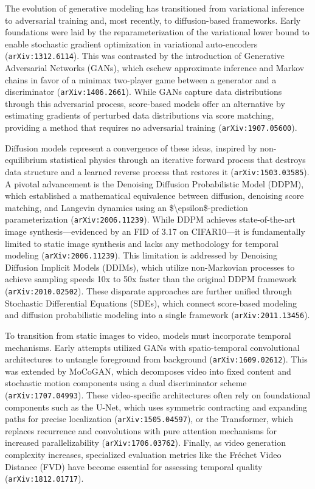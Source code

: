 \documentclass[11pt]{article}
\begin{document}
The evolution of generative modeling has transitioned from variational inference to adversarial training and, most recently, to diffusion-based frameworks. Early foundations were laid by the reparameterization of the variational lower bound to enable stochastic gradient optimization in variational auto-encoders (\texttt{arXiv:1312.6114}). This was contrasted by the introduction of Generative Adversarial Networks (GANs), which eschew approximate inference and Markov chains in favor of a minimax two-player game between a generator and a discriminator (\texttt{arXiv:1406.2661}). While GANs capture data distributions through this adversarial process, score-based models offer an alternative by estimating gradients of perturbed data distributions via score matching, providing a method that requires no adversarial training (\texttt{arXiv:1907.05600}).

Diffusion models represent a convergence of these ideas, inspired by non-equilibrium statistical physics through an iterative forward process that destroys data structure and a learned reverse process that restores it (\texttt{arXiv:1503.03585}). A pivotal advancement is the Denoising Diffusion Probabilistic Model (DDPM), which established a mathematical equivalence between diffusion, denoising score matching, and Langevin dynamics using an \$\textbackslash{}epsilon\$-prediction parameterization (\texttt{arXiv:2006.11239}). While DDPM achieves state-of-the-art image synthesis—evidenced by an FID of 3.17 on CIFAR10—it is fundamentally limited to static image synthesis and lacks any methodology for temporal modeling (\texttt{arXiv:2006.11239}). This limitation is addressed by Denoising Diffusion Implicit Models (DDIMs), which utilize non-Markovian processes to achieve sampling speeds 10x to 50x faster than the original DDPM framework (\texttt{arXiv:2010.02502}). These disparate approaches are further unified through Stochastic Differential Equations (SDEs), which connect score-based modeling and diffusion probabilistic modeling into a single framework (\texttt{arXiv:2011.13456}).

To transition from static images to video, models must incorporate temporal mechanisms. Early attempts utilized GANs with spatio-temporal convolutional architectures to untangle foreground from background (\texttt{arXiv:1609.02612}). This was extended by MoCoGAN, which decomposes video into fixed content and stochastic motion components using a dual discriminator scheme (\texttt{arXiv:1707.04993}). These video-specific architectures often rely on foundational components such as the U-Net, which uses symmetric contracting and expanding paths for precise localization (\texttt{arXiv:1505.04597}), or the Transformer, which replaces recurrence and convolutions with pure attention mechanisms for increased parallelizability (\texttt{arXiv:1706.03762}). Finally, as video generation complexity increases, specialized evaluation metrics like the Fréchet Video Distance (FVD) have become essential for assessing temporal quality (\texttt{arXiv:1812.01717}).
\end{document}

